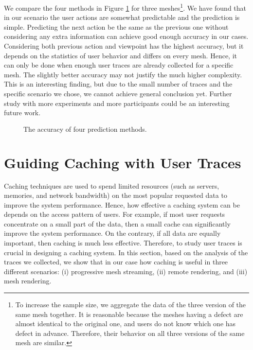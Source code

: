 We compare the four methods in Figure \ref{f:user:accuracy_comp} for three meshes\footnote{
To increase the sample size, we aggregate the data of the three version of the same mesh together.
It is reasonable because the meshes having a defect are almost identical to the original one, 
and users do not know which one has defect in advance. Therefore, their behavior on 
all three versions of the same mesh are similar.}.
We have found that in our scenario the user actions are somewhat predictable and the prediction is simple.
Predicting the next action be the same as the previous one without considering
any extra information can achieve good enough accuracy in our cases. 
Considering both previous action and viewpoint has the highest accuracy,
but it depends on the statistics of user behavior and differs on every mesh. 
Hence, it can only be done when enough user traces are already collected for a specific mesh. 
The slightly better accuracy may not justify the much higher complexity.
This is an interesting finding, but due to the small number of traces and the specific scenario we chose,
we cannot achieve general conclusion yet. Further study with more experiments and more participants could 
be an interesting future work.
\begin{figure}
    \centering
    \caption{The accuracy of four prediction methods.}
    \label{f:user:accuracy_comp}
\end{figure}

\section{Guiding Caching with User Traces}
Caching techniques are used to spend limited resources (such as 
servers, memories, and network bandwidth) on the most popular requested 
data to improve the system performance. 
Hence, how effective a caching system can be depends on the access pattern
of users. For example, if most user requests concentrate on a small 
part of the data, then a small cache can significantly improve the 
system performance. On the contrary, if all data are equally important,
then caching is much less effective. Therefore, to study user traces
is crucial in designing a caching system.
In this section, based on the analysis of the traces we collected, 
we show that in our case how caching is useful in three different scenarios:
(i) progressive mesh streaming, (ii) remote rendering, and (iii) 
mesh rendering.

